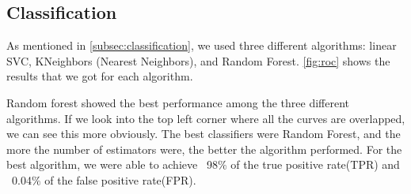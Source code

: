 \documentclass[\docopts]{\docclass}
\begin{document}
\subsection{Classification}
\label{subsec:classification_data}

As mentioned in \autoref{subsec:classification}, we used three different algorithms: linear SVC, KNeighbors (Nearest Neighbors), and
Random Forest. \autoref{fig:roc} shows the results that we got for
each algorithm.

Random forest showed the best performance among the three different
algorithms. If we look into the top left corner where all the curves are
overlapped, we can see this more obviously. The best classifiers were
Random Forest, and the more the number of estimators were, the better
the algorithm performed. For the best algorithm, we were able to achieve
~98$\%$ of the true positive rate(TPR) and ~0.04$\%$ of the false
positive rate(FPR).
\end{document}
